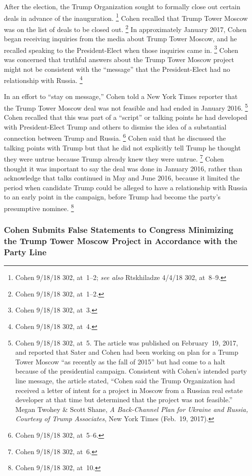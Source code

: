 After the election, the Trump Organization sought to formally close out certain deals in advance of the inauguration.%
\footnote{Cohen 9/18/18 302, at~1--2;
\textit{see also} Rtskhiladze 4/4/18 302, at~8--9.}
Cohen recalled that Trump Tower Moscow was on the list of deals to be closed out.%
\footnote{Cohen 9/18/18 302, at~1--2.}
In approximately January 2017, Cohen began receiving inquiries from the media about Trump Tower Moscow, and he recalled speaking to the President-Elect when those inquiries came in.%
\footnote{Cohen 9/18/18 302, at~3.}
Cohen was concerned that truthful answers about the Trump Tower Moscow project might not be consistent with the ``message'' that the President-Elect had no relationship with Russia.%
\footnote{Cohen 9/18/18 302, at~4.}

In an effort to ``stay on message,'' Cohen told a New York Times reporter that the Trump Tower Moscow deal was not feasible and had ended in January 2016.%
\footnote{Cohen 9/18/18 302, at~5.
The article was published on February~19, 2017, and reported that Sater and Cohen had been working on plan for a Trump Tower Moscow ``as recently as the fall of 2015'' but had come to a halt because of the presidential campaign.
Consistent with Cohen's intended party line message, the article stated, ``Cohen said the Trump Organization had received a letter of intent for a project in Moscow from a Russian real estate developer at that time but determined that the project was not feasible.''
Megan Twohey \& Scott Shane, \textit{A Back-Channel Plan for Ukraine and Russia, Courtesy of Trump Associates}, New York Times (Feb.~19, 2017).}
Cohen recalled that this was part of a ``script'' or talking points he had developed with President-Elect Trump and others to dismiss the idea of a substantial connection between Trump and Russia.%
\footnote{Cohen 9/18/18 302, at~5--6.}
Cohen said that he discussed the talking points with Trump but that he did not explicitly tell Trump he thought they were untrue because Trump already knew they were untrue.%
\footnote{Cohen 9/18/18 302, at~6.}
Cohen thought it was important to say the deal was done in January 2016, rather than acknowledge that talks continued in May and June 2016, because it limited the period when candidate Trump could be alleged to have a relationship with Russia to an early point in the campaign, before Trump had become the party's presumptive nominee.%
\footnote{Cohen 9/18/18 302, at~10.}

\subsubsection{Cohen Submits False Statements to Congress Minimizing the Trump Tower Moscow Project in Accordance with the Party Line}

